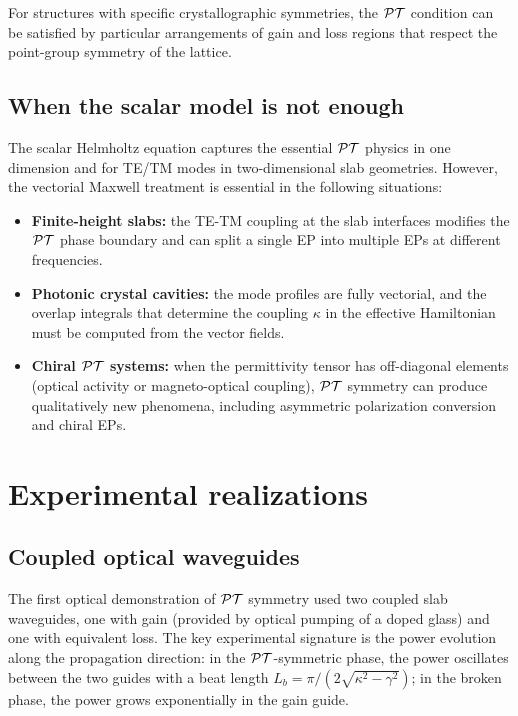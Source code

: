 For structures with specific crystallographic symmetries, the $\mathcal{PT}$
condition can be satisfied by particular arrangements of gain and loss
regions that respect the point-group symmetry of the lattice.

\subsection{When the scalar model is not enough}
\label{ssec:beyond-scalar}

The scalar Helmholtz equation captures the essential $\mathcal{PT}$ physics in
one dimension and for TE/TM modes in two-dimensional slab geometries.
However, the vectorial Maxwell treatment is essential in the following
situations:
\begin{itemize}
 \item \textbf{Finite-height slabs:} the TE-TM coupling at the
 slab interfaces modifies the $\mathcal{PT}$ phase boundary and can split
 a single EP into multiple EPs at different frequencies.
 \item \textbf{Photonic crystal cavities:} the mode profiles are
 fully vectorial, and the overlap integrals that determine the
 coupling $\kappa$ in the effective Hamiltonian must be computed from
 the vector fields.
 \item \textbf{Chiral $\mathcal{PT}$ systems:} when the permittivity tensor
 has off-diagonal elements (optical activity or magneto-optical
 coupling), $\mathcal{PT}$ symmetry can produce qualitatively new phenomena,
 including asymmetric polarization conversion and chiral EPs.
\end{itemize}


\section{Experimental realizations}
\label{sec:pt-experiments}

\subsection{Coupled optical waveguides}
\label{ssec:pt-waveguides}

The first optical demonstration of $\mathcal{PT}$ symmetry used two coupled
slab waveguides, one with gain (provided by optical pumping of a doped
glass) and one with equivalent loss. The key experimental signature is
the power evolution along the propagation direction: in the
$\mathcal{PT}$-symmetric phase, the power oscillates between the two guides
with a beat length $L_b = \pi/(2\sqrt{\kappa^2-\gamma^2})$; in the
broken phase, the power grows exponentially in the gain guide.

